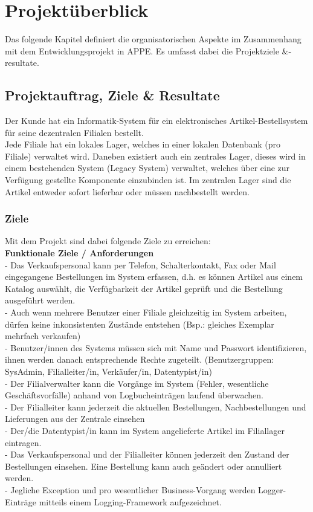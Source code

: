 \section{Projektüberblick}
Das folgende Kapitel definiert die organisatorischen Aspekte im Zusammenhang mit dem Entwicklungsprojekt in APPE. Es umfasst dabei die Projektziele \&-resultate.
\subsection{Projektauftrag, Ziele \& Resultate}
Der Kunde hat ein Informatik-System für ein elektronisches Artikel-Bestellsystem für seine dezentralen Filialen bestellt.\\
Jede Filiale hat ein lokales Lager, welches in einer lokalen Datenbank (pro Filiale) verwaltet wird. Daneben existiert auch ein zentrales Lager, dieses wird in einem bestehenden System (Legacy System) verwaltet, welches über eine zur Verfügung gestellte Komponente einzubinden ist. Im zentralen Lager sind die Artikel entweder sofort lieferbar oder müssen nachbestellt werden.
\subsubsection{Ziele}
Mit dem Projekt sind dabei folgende Ziele zu erreichen:\\
\textbf{Funktionale Ziele / Anforderungen}\\
- Das Verkaufspersonal kann per Telefon, Schalterkontakt, Fax oder Mail eingegangene Bestellungen im System erfassen, d.h. es können Artikel aus einem Katalog auswählt, die Verfügbarkeit der Artikel geprüft und die Bestellung ausgeführt werden.\\
- Auch wenn mehrere Benutzer einer Filiale gleichzeitig im System arbeiten, dürfen keine inkonsistenten Zustände entstehen (Bsp.: gleiches Exemplar mehrfach verkaufen)\\
- Benutzer/innen des Systems müssen sich mit Name und Passwort identifizieren, ihnen werden danach entsprechende Rechte zugeteilt. (Benutzergruppen: SysAdmin, Filialleiter/in, Verkäufer/in, Datentypist/in)\\
- Der Filialverwalter kann die Vorgänge im System (Fehler, wesentliche Geschäftsvorfälle) anhand von Logbucheinträgen laufend überwachen.\\
- Der Filialleiter kann jederzeit die aktuellen Bestellungen, Nachbestellungen und Lieferungen aus der Zentrale einsehen\\
- Der/die Datentypist/in kann im System angelieferte Artikel im Filiallager eintragen.\\
- Das Verkaufspersonal und der Filialleiter können jederzeit den Zustand der Bestellungen einsehen. Eine Bestellung kann auch geändert oder annulliert werden.\\
- Jegliche Exception und pro wesentlicher Business-Vorgang werden Logger-Einträge mitteils einem Logging-Framework aufgezeichnet.\\

